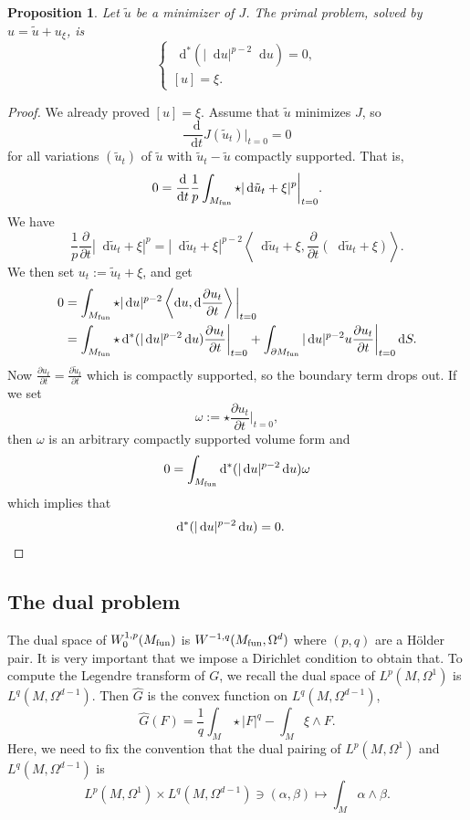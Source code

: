 \documentclass[reqno,12pt]{amsart}
\newcommand*\dif{\mathop{}\!\mathrm{d}}
\newtheorem{proposition}[theorem]{Proposition}
\theoremstyle{definition}
\numberwithin{equation}{section}
\begin{document}
\begin{proposition}
Let $\tilde u$ be a minimizer of $J$.
The primal problem, solved by $u = \tilde u + u_\xi$, is
\begin{equation}\label{primal pLap}
\begin{cases}
\dif^*(|\dif u|^{p - 2} \dif u) = 0, \\
[u] = \xi.
\end{cases}
\end{equation}
\end{proposition}
\begin{proof}
We already proved $[u] = \xi$.
Assume that $\tilde u$ minimizes $J$, so
$$\frac{\dif}{\dif t} J(\tilde u_t)\bigg|_{t = 0} = 0$$
for all variations $(\tilde u_t)$ of $\tilde u$ with $\tilde u_t - \tilde u$ compactly supported.
That is,
$$0 = \frac{\dif}{\dif t} \frac{1}{p} \int_{M_{\rm fun}} \star |\dif \tilde u_t + \xi|^p\bigg|_{t = 0}.$$
We have 
$$\frac{1}{p} \frac{\partial}{\partial t} |\dif \tilde u_t + \xi|^p = |\dif \tilde u_t + \xi|^{p - 2} \left\langle \dif \tilde u_t + \xi, \frac{\partial}{\partial t} (\dif \tilde u_t + \xi)\right\rangle.$$
We then set $u_t := \tilde u_t + \xi$, and get
\begin{align*}
0
&= \int_{M_{\rm fun}} \star |\dif u|^{p - 2} \left\langle \dif u, \dif \frac{\partial u_t}{\partial t}\right\rangle\bigg|_{t = 0} \\
&= \int_{M_{\rm fun}} \star \dif^* (|\dif u|^{p - 2} \dif u) \frac{\partial u_t}{\partial t}\bigg|_{t = 0} + \int_{\partial M_{\rm fun}} |\dif u|^{p - 2} u \frac{\partial u_t}{\partial t}\bigg|_{t=0} \dif S.
\end{align*}
Now $\frac{\partial u_t}{\partial t} = \frac{\partial \tilde u_t}{\partial t}$ which is compactly supported, so the boundary term drops out. If we set
$$\omega := \star \frac{\partial u_t}{\partial t}\bigg|_{t = 0},$$
then $\omega$ is an arbitrary compactly supported volume form and
$$0 = \int_{M_{\rm fun}} \dif^* (|\dif u|^{p - 2} \dif u) \omega$$
which implies that 
\begin{align*}
\dif^* (|\dif u|^{p - 2} \dif u) &= 0. \qedhere
\end{align*}
\end{proof}

\subsection{The dual problem}
The dual space of $W^{1, p}_0(M_{\rm fun})$ is $W^{-1, q}(M_{\rm fun}, \Omega^d)$ where $(p, q)$ are a H\"older pair.
It is very important that we impose a Dirichlet condition to obtain that.
To compute the Legendre transform of $G$, we recall the dual space of $L^p(M, \Omega^1)$ is $L^q(M, \Omega^{d - 1})$.
Then $\hat G$ is the convex function on $L^q(M, \Omega^{d - 1})$,
$$\hat G(F) = \frac{1}{q} \int_M \star |F|^q - \int_M \xi \wedge F.$$
Here, we need to fix the convention that the dual pairing of $L^p(M, \Omega^1)$ and $L^q(M, \Omega^{d - 1})$ is 
$$L^p(M, \Omega^1) \times L^q(M, \Omega^{d - 1}) \ni (\alpha, \beta) \mapsto \int_M \alpha \wedge \beta.$$
\end{document}
